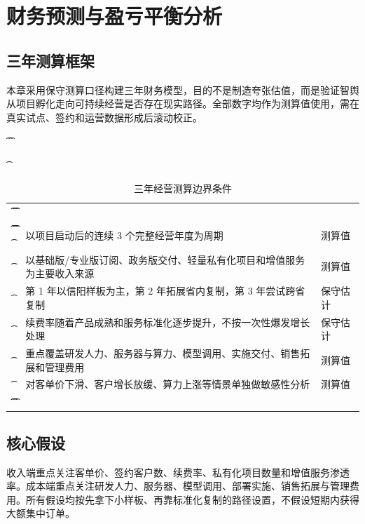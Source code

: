 \chapter{财务预测与盈亏平衡分析}

\section{三年测算框架}

本章采用保守测算口径构建三年财务模型，目的不是制造夸张估值，而是验证智舆从项目孵化走向可持续经营是否存在现实路径。全部数字均作为测算值使用，需在真实试点、签约和运营数据形成后滚动校正。

\begin{table}[htbp]
	\t\centering
	\t\caption{三年经营测算边界条件}
	\t\begin{tabularx}{\textwidth}{|L{3.2cm}YL{3.1cm}|}
		\t\t\toprule
		\t\t{} &                        &  \\
		\t\t\midrule
		\t\t{}
		\t{}           & 以项目启动后的连续 3 个完整经营年度为周期               & 测算值            \\
		\t{}           & 以基础版/专业版订阅、政务版交付、轻量私有化项目和增值服务为主要收入来源 & 测算值            \\
		\t{}           & 第 1 年以信阳样板为主，第 2 年拓展省内复制，第 3 年尝试跨省复制 & 保守估计           \\
		\t{}           & 续费率随着产品成熟和服务标准化逐步提升，不按一次性爆发增长处理      & 保守估计           \\
		\t{}           & 重点覆盖研发人力、服务器与算力、模型调用、实施交付、销售拓展和管理费用  & 测算值            \\
		\t{}           & 对客单价下滑、客户增长放缓、算力上涨等情景单独做敏感性分析        & 测算值            \\
		\t\t\bottomrule
		\t\end{tabularx}
\end{table}

\section{核心假设}

收入端重点关注客单价、签约客户数、续费率、私有化项目数量和增值服务渗透率。成本端重点关注研发人力、服务器、模型调用、部署实施、销售拓展与管理费用。所有假设均按先拿下小样板、再靠标准化复制的路径设置，不假设短期内获得大额集中订单。

